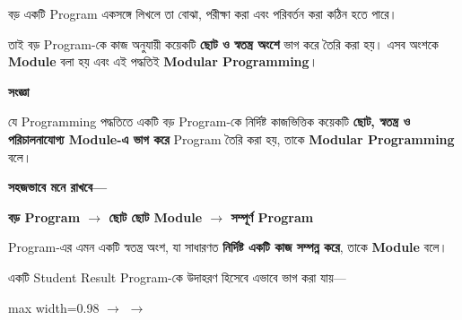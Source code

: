 
বড় একটি Program একসঙ্গে লিখলে তা বোঝা, পরীক্ষা করা এবং পরিবর্তন
করা কঠিন হতে পারে।

তাই বড় Program-কে কাজ অনুযায়ী কয়েকটি
\textbf{ছোট ও স্বতন্ত্র অংশে} ভাগ করে তৈরি করা হয়।
এসব অংশকে \textbf{Module} বলা হয় এবং এই পদ্ধতিই
\textbf{Modular Programming}।


\begin{definitionbox}

\textbf{\color{darkTeal}সংজ্ঞা}

যে Programming পদ্ধতিতে একটি বড় Program-কে নির্দিষ্ট কাজভিত্তিক
কয়েকটি \textbf{ছোট, স্বতন্ত্র ও পরিচালনাযোগ্য Module-এ ভাগ করে}
Program তৈরি করা হয়, তাকে \textbf{Modular Programming} বলে।

\end{definitionbox}

\textbf{সহজভাবে মনে রাখবে—}

\begin{center}

\textbf{
বড় Program
\(\longrightarrow\)
ছোট ছোট Module
\(\longrightarrow\)
সম্পূর্ণ Program
}

\end{center}


\begin{definitionbox}

Program-এর এমন একটি স্বতন্ত্র অংশ, যা সাধারণত
\textbf{নির্দিষ্ট একটি কাজ সম্পন্ন করে}, তাকে
\textbf{Module} বলে।

\end{definitionbox}

একটি Student Result Program-কে উদাহরণ হিসেবে এভাবে ভাগ করা যায়—

\begin{center}
\begin{adjustbox}{max width=0.98\linewidth}
\quad
\(\longrightarrow\)
\quad
{}
\quad
\(\longrightarrow\)
\quad
{}
\end{adjustbox}
\end{center}

